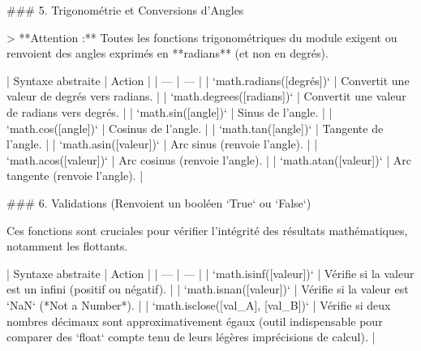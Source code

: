 ### 5. Trigonométrie et Conversions d'Angles

> **Attention :** Toutes les fonctions trigonométriques du module exigent ou renvoient des angles exprimés en **radians** (et non en degrés).

| Syntaxe abstraite | Action |
| --- | --- |
| `math.radians([degrés])` | Convertit une valeur de degrés vers radians. |
| `math.degrees([radians])` | Convertit une valeur de radians vers degrés. |
| `math.sin([angle])` | Sinus de l'angle. |
| `math.cos([angle])` | Cosinus de l'angle. |
| `math.tan([angle])` | Tangente de l'angle. |
| `math.asin([valeur])` | Arc sinus (renvoie l'angle). |
| `math.acos([valeur])` | Arc cosinus (renvoie l'angle). |
| `math.atan([valeur])` | Arc tangente (renvoie l'angle). |

### 6. Validations (Renvoient un booléen `True` ou `False`)

Ces fonctions sont cruciales pour vérifier l'intégrité des résultats mathématiques, notamment les flottants.

| Syntaxe abstraite | Action |
| --- | --- |
| `math.isinf([valeur])` | Vérifie si la valeur est un infini (positif ou négatif). |
| `math.isnan([valeur])` | Vérifie si la valeur est `NaN` (*Not a Number*). |
| `math.isclose([val_A], [val_B])` | Vérifie si deux nombres décimaux sont approximativement égaux (outil indispensable pour comparer des `float` compte tenu de leurs légères imprécisions de calcul). |